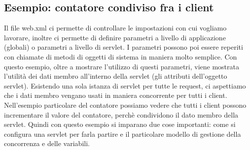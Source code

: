\subsection{Esempio: contatore condiviso fra i client}
Il file web.xml ci permette di controllare le impostazioni con cui vogliamo lavorare, inoltre ci permette di definire parametri a livello di applicazione (globali) o parametri a livello di servlet.\newline
I parametri possono poi essere reperiti con chiamate di metodi di oggetti di sistema in maniera molto semplice.\newline
Con questo esempio, oltre a mostrare l'utilizzo di questi parametri, viene mostrata l'utilità dei dati membro all'interno della servlet (gli attributi dell'oggetto servlet). Esistendo una sola istanza di servlet per tutte le request, ci aspettiamo che i dati membro vengano usati in maniera concorrente per tutti i client.\newline
Nell'esempio particolare del contatore possiamo vedere che tutti i client possono incrementare il valore del contatore, perchè condividono il dato membro della servlet.\newline
Quindi con questo esempio si imparano due cose importanti: come si configura una servlet per farla partire e il particolare modello di gestione della concorrenza e delle variabili.
